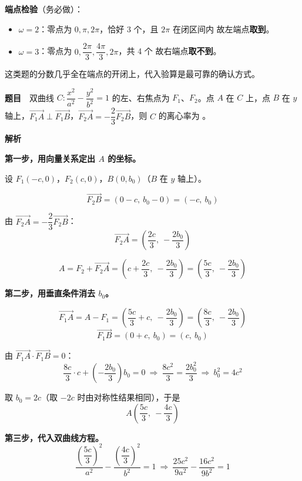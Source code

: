 \begin{gktip}
\textbf{端点检验}（务必做）：
\begin{itemize}
\item $\omega=2$：零点为 $0,\pi,2\pi$，恰好 3 个，且 $2\pi$ 在闭区间内  故左端点\textbf{取到}。
\item $\omega=3$：零点为 $0,\dfrac{2\pi}3,\dfrac{4\pi}3,2\pi$，共 4 个  故右端点\textbf{取不到}。
\end{itemize}

这类题的分数几乎全在端点的开闭上，代入验算是最可靠的确认方式。
\end{gktip}

\par\medskip


\textbf{题目}　双曲线 $C:\dfrac{x^{2}}{a^{2}}-\dfrac{y^{2}}{b^{2}}=1$ 的左、右焦点为 $F_1$、$F_2$。点 $A$ 在 $C$ 上，点 $B$ 在 $y$ 轴上，$\overrightarrow{F_1A}\perp\overrightarrow{F_1B}$，$\overrightarrow{F_2A}=-\dfrac23\overrightarrow{F_2B}$，则 $C$ 的离心率为 \gkblank{}。

\textbf{解析}

\textbf{第一步，用向量关系定出 $A$ 的坐标。}

设 $F_1(-c,0)$，$F_2(c,0)$，$B\left(0,b_0\right)$（$B$ 在 $y$ 轴上）。

\[\overrightarrow{F_2B}=(0-c,\ b_0-0)=\left(-c,\ b_0\right)\]

由 $\overrightarrow{F_2A}=-\dfrac23\overrightarrow{F_2B}$：
\[\overrightarrow{F_2A}=\left(\frac{2c}3,\ -\frac{2b_0}3\right)\]

\[A=F_2+\overrightarrow{F_2A}=\left(c+\frac{2c}3,\ -\frac{2b_0}3\right)=\left(\frac{5c}3,\ -\frac{2b_0}3\right)\]

\textbf{第二步，用垂直条件消去 $b_0$。}

\[\overrightarrow{F_1A}=A-F_1=\left(\frac{5c}3+c,\ -\frac{2b_0}3\right)=\left(\frac{8c}3,\ -\frac{2b_0}3\right)\]
\[\overrightarrow{F_1B}=\left(0+c,\ b_0\right)=\left(c,\ b_0\right)\]

由 $\overrightarrow{F_1A}\cdot\overrightarrow{F_1B}=0$：
\[\frac{8c}3\cdot c+\left(-\frac{2b_0}3\right)b_0=0\ \Longrightarrow\ \frac{8c^{2}}3=\frac{2b_0^{2}}3\ \Longrightarrow\ b_0^{2}=4c^{2}\]

取 $b_0=2c$（取 $-2c$ 时由对称性结果相同），于是
\[A\left(\frac{5c}3,\ -\frac{4c}3\right)\]

\textbf{第三步，代入双曲线方程。}
\[\frac{\left(\dfrac{5c}3\right)^{2}}{a^{2}}-\frac{\left(\dfrac{4c}3\right)^{2}}{b^{2}}=1\ \Longrightarrow\ \frac{25c^{2}}{9a^{2}}-\frac{16c^{2}}{9b^{2}}=1\]

